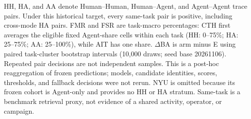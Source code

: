 \documentclass[10pt]{article}
\begin{document}
\noindent\begin{minipage}{\linewidth}\footnotesize
HH, HA, and AA denote Human--Human, Human--Agent, and Agent--Agent trace pairs. Under this historical target, every same-task pair is positive, including cross-mode HA pairs. FMR and FSR are task-macro percentages: CTH first averages the eligible fixed Agent-share cells within each task (HH: 0--75\%; HA: 25--75\%; AA: 25--100\%), while AIT has one share. $\Delta$BA is arm minus E using paired task-cluster bootstrap intervals (10{,}000 draws; seed base 20261106). Repeated pair decisions are not independent samples. This is a post-hoc reaggregation of frozen predictions; models, candidate identities, scores, thresholds, and fallback decisions were not rerun. NYU is omitted because its frozen cohort is Agent-only and provides no HH or HA stratum. Same-task is a benchmark retrieval proxy, not evidence of a shared activity, operator, or campaign.
\end{minipage}
\endgroup
\end{document}
